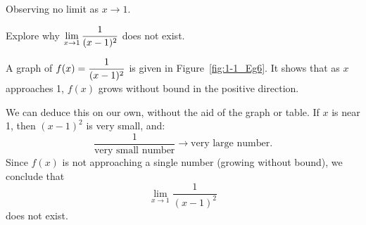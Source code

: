 \begin{marginfigure}[1cm]
\caption{Observing no limit as $x \to 1$.}\label{fig:1-1_Eg6}
\end{marginfigure}

\begin{example} \label{Ex:1.1.Eg6}
Explore why $\displaystyle \lim_{x\to 1} \frac{1}{(x-1)^2}$ does not exist.

\solution A graph of $\displaystyle f(x) = \frac{1}{(x-1)^2}$ is given in Figure~\ref{fig:1-1_Eg6}. It shows that as $x$ approaches 1, $f(x)$ grows without bound in the positive direction. 

We can deduce this on our own, without the aid of the graph or table. If $x$ is near 1, then $(x-1)^2$ is very small, and: 
\[ \frac{1}{\text{very small number}} \rightarrow \text{very large number}.\]
Since $f(x)$ is not approaching a single number (growing without bound), we conclude that 
\[ \lim_{x \to 1} \frac{1}{(x-1)^2} \] 
does not exist.
\end{example}